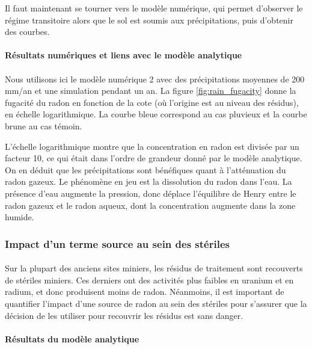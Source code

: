 \documentclass{article}
\begin{document}
Il faut maintenant se tourner vers le modèle numérique, qui permet d’observer le régime transitoire alors que le sol est soumis aux précipitations, puis d'obtenir des courbes.

\paragraph{Résultats numériques et liens avec le modèle analytique}

\paragraph{} Nous utilisons ici le modèle numérique 2 avec des précipitations moyennes de 200 mm/an et une simulation pendant un an. La figure \ref{fig:rain_fugacity} donne la fugacité du radon en fonction de la cote (où l'origine est au niveau des résidus), en échelle logarithmique. La courbe bleue correspond au cas pluvieux et la courbe brune au cas témoin.

L’échelle logarithmique montre que la concentration en radon est divisée par un facteur 10, ce qui était dans l'ordre de grandeur donné par le modèle analytique. On en déduit que les précipitations sont bénéfiques quant à l’atténuation du radon gazeux. Le phénomène en jeu est la dissolution du radon dans l’eau. La présence d’eau augmente la pression, donc déplace l’équilibre de Henry entre le radon gazeux et le radon aqueux, dont la concentration augmente dans la zone humide.

\newpage
\subsubsection{Impact d'un terme source au sein des stériles}

\paragraph{} Sur la plupart des anciens sites miniers, les résidus de traitement sont recouverts de stériles miniers. Ces derniers ont des activités plus faibles en uranium et en radium, et donc produisent moins de radon. Néanmoins, il est important de quantifier l'impact d'une source de radon au sein des stériles pour s'assurer que la décision de les utiliser pour recouvrir les résidus est sans danger.

\paragraph{Résultats du modèle analytique}
\end{document}
